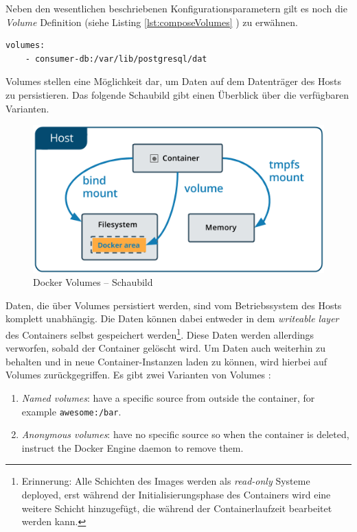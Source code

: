 Neben den wesentlichen beschriebenen Konfigurationsparametern gilt es noch die \emph{Volume} Definition (siehe Listing \ref{lst:composeVolumes} ) zu erwähnen. 


\begin{lstlisting}[style=bashStyle,caption={Docker Compose - Volume Definition},label=lst:composeVolumes]
  volumes:
    - consumer-db:/var/lib/postgresql/dat
\end{lstlisting}

Volumes stellen eine Möglichkeit dar, um Daten auf dem Datenträger des Hosts zu persistieren. Das folgende Schaubild gibt einen Überblick über die verfügbaren Varianten.

\begin{figure}[ht!]
	\centering
	\includegraphics[width=.6\linewidth]{kapitel/problemloesung/implementierung/_img/types-of-mounts-volume}
	\caption[Docker Volumes -- Schaubild]{Docker Volumes -- Schaubild \cite[Kapitel~/storage/volumes/]{docker-doc}}
	\label{fig:dockerImage}
\end{figure}

Daten, die über Volumes persistiert werden, sind vom Betriebssystem des Hosts komplett unabhängig. Die Daten können dabei entweder in dem \emph{writeable layer} des Containers selbst gespeichert werden\footnote{Erinnerung: Alle Schichten des Images werden als \emph{read-only} Systeme deployed, erst während der Initialisierungsphase des Containers wird eine weitere Schicht hinzugefügt, die während der Containerlaufzeit bearbeitet werden kann.}. Diese Daten werden allerdings verworfen, sobald der Container gelöscht wird. Um Daten auch weiterhin zu behalten und in neue Container-Instanzen laden zu können, wird hierbei auf Volumes zurückgegriffen. Es gibt zwei Varianten von Volumes \cite[Kapitel~/storage/volumes]{docker-doc}: 

\begin{enumerate}
  \item \emph{Named volumes}: have a specific source from outside the container, for example \verb+awesome:/bar+.
  \item \emph{Anonymous volumes}: have no specific source so when the container is deleted, instruct the Docker Engine daemon to remove them.
\end{enumerate}

